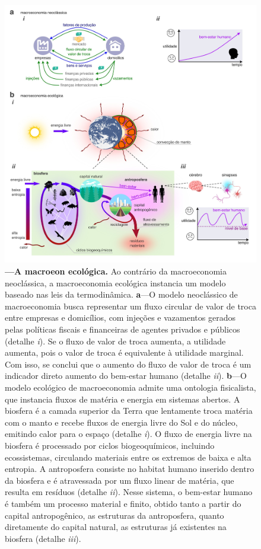 \documentclass[./main.tex]{subfiles}
\begin{document}
\begin{figure}[t!] 
\centering				
\includegraphics[width=0.98\linewidth]{figs/fig_ecomodel.jpg}		
\caption[A \gls{macroeon} Ecológica]
{\textbf{---\;A \gls{macroeon} ecológica.}
    Ao contrário da macroeconomia neoclássica, a macroeconomia ecológica instancia um modelo baseado nas leis da termodinâmica.     
    \;\textbf{a}\;---\;O modelo neoclássico de macroeconomia busca representar um fluxo circular de valor de troca entre empresas e domicílios, com injeções e vazamentos gerados pelas políticas fiscais e financeiras de agentes privados e públicos (detalhe \textrm{\textit{i}}). Se o fluxo de valor de troca aumenta, a utilidade aumenta, pois o valor de troca é equivalente à utilidade marginal. Com isso, se conclui que o aumento do fluxo de valor de troca é um indicador direto aumento do bem-estar humano (detalhe \textrm{\textit{ii}}).    
    \;\textbf{b}\;---\;O modelo ecológico de macroeconomia admite uma ontologia fisicalista, que instancia fluxos de matéria e energia em sistemas abertos. A biosfera é a camada superior da Terra que lentamente troca matéria com o manto e recebe fluxos de energia livre do Sol e do núcleo, emitindo calor para o espaço (detalhe \textrm{\textit{i}}). O fluxo de energia livre na biosfera é processado por ciclos biogeoquímicos, incluindo ecossistemas, circulando materiais entre os extremos de baixa e alta entropia. A antroposfera consiste no habitat humano inserido dentro da biosfera e é atravessada por um fluxo linear de matéria, que resulta em resíduos (detalhe \textrm{\textit{ii}}). Nesse sistema, o bem-estar humano é também um processo material e finito, obtido tanto a partir do capital antropogênico, as estruturas da antroposfera, quanto diretamente do capital natural, as estruturas já existentes na biosfera (detalhe \textrm{\textit{iii}}).
}
\label{fig:eco:ecomodel} 		
\end{figure}
\end{document}
